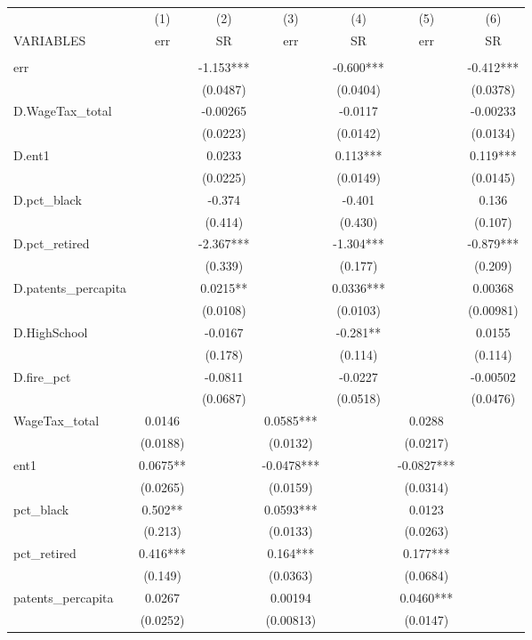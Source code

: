 \begin{tabular}{lcccccc} \hline
 & (1) & (2) & (3) & (4) & (5) & (6) \\
VARIABLES & err & SR & err & SR & err & SR \\ \hline
 &  &  &  &  &  &  \\
err &  & -1.153*** &  & -0.600*** &  & -0.412*** \\
 &  & (0.0487) &  & (0.0404) &  & (0.0378) \\
D.WageTax\_total &  & -0.00265 &  & -0.0117 &  & -0.00233 \\
 &  & (0.0223) &  & (0.0142) &  & (0.0134) \\
D.ent1 &  & 0.0233 &  & 0.113*** &  & 0.119*** \\
 &  & (0.0225) &  & (0.0149) &  & (0.0145) \\
D.pct\_black &  & -0.374 &  & -0.401 &  & 0.136 \\
 &  & (0.414) &  & (0.430) &  & (0.107) \\
D.pct\_retired &  & -2.367*** &  & -1.304*** &  & -0.879*** \\
 &  & (0.339) &  & (0.177) &  & (0.209) \\
D.patents\_percapita &  & 0.0215** &  & 0.0336*** &  & 0.00368 \\
 &  & (0.0108) &  & (0.0103) &  & (0.00981) \\
D.HighSchool &  & -0.0167 &  & -0.281** &  & 0.0155 \\
 &  & (0.178) &  & (0.114) &  & (0.114) \\
D.fire\_pct &  & -0.0811 &  & -0.0227 &  & -0.00502 \\
 &  & (0.0687) &  & (0.0518) &  & (0.0476) \\
WageTax\_total & 0.0146 &  & 0.0585*** &  & 0.0288 &  \\
 & (0.0188) &  & (0.0132) &  & (0.0217) &  \\
ent1 & 0.0675** &  & -0.0478*** &  & -0.0827*** &  \\
 & (0.0265) &  & (0.0159) &  & (0.0314) &  \\
pct\_black & 0.502** &  & 0.0593*** &  & 0.0123 &  \\
 & (0.213) &  & (0.0133) &  & (0.0263) &  \\
pct\_retired & 0.416*** &  & 0.164*** &  & 0.177*** &  \\
 & (0.149) &  & (0.0363) &  & (0.0684) &  \\
patents\_percapita & 0.0267 &  & 0.00194 &  & 0.0460*** &  \\
 & (0.0252) &  & (0.00813) &  & (0.0147) &  \\

\end{tabular}
